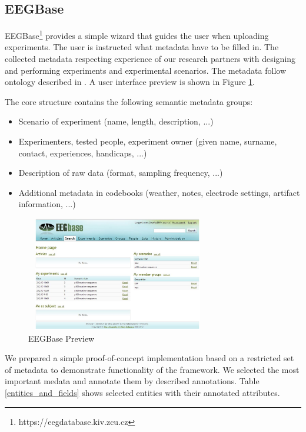 \documentclass[a4paper,twoside]{article}
\begin{document}
\subsection{EEGBase} \label{Portal}



EEGBase\footnote{https://eegdatabase.kiv.zcu.cz} provides a simple wizard that guides the user when uploading experiments. The user is instructed what metadata have to be filled in. The collected metadata respecting experience of our research partners with designing and performing experiments and experimental scenarios. The metadata follow ontology described in \cite{BMEI_jezek_moucek}. A user interface preview is shown in Figure \ref{portal}.

The core structure contains the following semantic metadata groups:

\begin{itemize}
\item Scenario of experiment (name, length, description, ...)
\item Experimenters, tested people, experiment owner (given name, surname, contact, experiences, handicaps, ...)
\item Description of raw data (format, sampling frequency, ...)
\item Additional metadata in codebooks (weather, notes, electrode settings, artifact information, ...)
\end{itemize}


\begin{figure}
\centering\includegraphics[width=8cm, height=5cm]{portal_preview}
\caption{\label{portal}EEGBase Preview}

\end{figure}

We prepared a simple proof-of-concept implementation based on a restricted set of metadata to demonstrate functionality of the framework. We selected the most important medata and annotate them by described annotations. Table \ref{entities_and_fields} shows selected entities with their annotated attributes.
\end{document}
